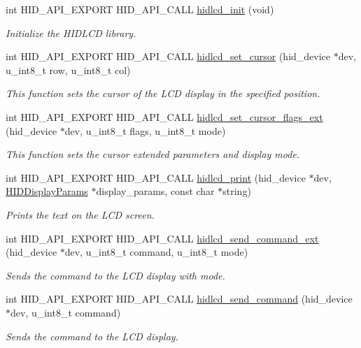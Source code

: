 \begin{DoxyCompactItemize}
int H\+I\+D\+\_\+\+A\+P\+I\+\_\+\+E\+X\+P\+O\+RT H\+I\+D\+\_\+\+A\+P\+I\+\_\+\+C\+A\+LL \hyperlink{group__API_ga37c732d4d14ea4584ee33e6e258deba7}{hidlcd\+\_\+init} (void)
\begin{DoxyCompactList}\small\item\em Initialize the H\+I\+D\+L\+CD library. \end{DoxyCompactList}\item 
int H\+I\+D\+\_\+\+A\+P\+I\+\_\+\+E\+X\+P\+O\+RT H\+I\+D\+\_\+\+A\+P\+I\+\_\+\+C\+A\+LL \hyperlink{group__API_ga0c27c33eef05230a5ed6e1d6ea6cb489}{hidlcd\+\_\+set\+\_\+cursor} (hid\+\_\+device $\ast$dev, u\+\_\+int8\+\_\+t row, u\+\_\+int8\+\_\+t col)
\begin{DoxyCompactList}\small\item\em This function sets the cursor of the L\+CD display in the specified position. \end{DoxyCompactList}\item 
int H\+I\+D\+\_\+\+A\+P\+I\+\_\+\+E\+X\+P\+O\+RT H\+I\+D\+\_\+\+A\+P\+I\+\_\+\+C\+A\+LL \hyperlink{group__API_gae33cb27bbbe1ae372fd3b98f16bd665d}{hidlcd\+\_\+set\+\_\+cursor\+\_\+flags\+\_\+ext} (hid\+\_\+device $\ast$dev, u\+\_\+int8\+\_\+t flags, u\+\_\+int8\+\_\+t mode)
\begin{DoxyCompactList}\small\item\em This function sets the cursor extended parameters and display mode. \end{DoxyCompactList}\item 
int H\+I\+D\+\_\+\+A\+P\+I\+\_\+\+E\+X\+P\+O\+RT H\+I\+D\+\_\+\+A\+P\+I\+\_\+\+C\+A\+LL \hyperlink{group__API_gab5c3e5de5b25ce048739fb5570fceabc}{hidlcd\+\_\+print} (hid\+\_\+device $\ast$dev, \hyperlink{structHIDDisplayParams}{H\+I\+D\+Display\+Params} $\ast$display\+\_\+params, const char $\ast$string)
\begin{DoxyCompactList}\small\item\em Prints the text on the L\+CD screen. \end{DoxyCompactList}\item 
int H\+I\+D\+\_\+\+A\+P\+I\+\_\+\+E\+X\+P\+O\+RT H\+I\+D\+\_\+\+A\+P\+I\+\_\+\+C\+A\+LL \hyperlink{group__API_gad6c000babbc378230a1a7023bd53b8b2}{hidlcd\+\_\+send\+\_\+command\+\_\+ext} (hid\+\_\+device $\ast$dev, u\+\_\+int8\+\_\+t command, u\+\_\+int8\+\_\+t mode)
\begin{DoxyCompactList}\small\item\em Sends the command to the L\+CD display with mode. \end{DoxyCompactList}\item 
int H\+I\+D\+\_\+\+A\+P\+I\+\_\+\+E\+X\+P\+O\+RT H\+I\+D\+\_\+\+A\+P\+I\+\_\+\+C\+A\+LL \hyperlink{group__API_ga1ec7653ee073e917475c01ee9e1252e4}{hidlcd\+\_\+send\+\_\+command} (hid\+\_\+device $\ast$dev, u\+\_\+int8\+\_\+t command)
\begin{DoxyCompactList}\small\item\em Sends the command to the L\+CD display. \end{DoxyCompactList}\end{DoxyCompactItemize}


